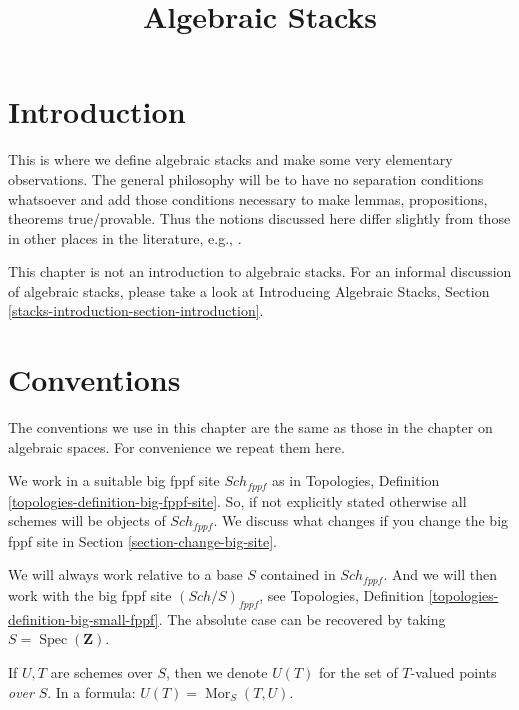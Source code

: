 \documentclass{stacks-project}
\theoremstyle{plain}
\theoremstyle{definition}
\theoremstyle{remark}
\numberwithin{equation}{subsection}
\def\Spec{\mathop{\mathrm{Spec}}}
\def\Sch{\mathit{Sch}}
\def\Mor{\mathop{\mathrm{Mor}}\nolimits}
\begin{document}
\title{Algebraic Stacks}


\maketitle

\label{section-phantom}

\tableofcontents

\section{Introduction}
\label{section-introduction}

\noindent
This is where we define algebraic stacks and make some very elementary
observations. The general philosophy will be to have no separation
conditions whatsoever and add those conditions necessary to make lemmas,
propositions, theorems true/provable. Thus the notions discussed here
differ slightly from those in other places in the literature, e.g.,
\cite{LM-B}.

\medskip\noindent
This chapter is not an introduction to algebraic stacks.
For an informal discussion of algebraic stacks, please take a look at
Introducing Algebraic Stacks, Section
\ref{stacks-introduction-section-introduction}.


\section{Conventions}
\label{section-conventions}

\noindent
The conventions we use in this chapter are the same as those in the
chapter on algebraic spaces. For convenience we repeat them here.

\medskip\noindent
We work in a suitable big fppf site $\Sch_{fppf}$
as in Topologies, Definition \ref{topologies-definition-big-fppf-site}.
So, if not explicitly stated otherwise all schemes will be objects
of $\Sch_{fppf}$. We discuss what changes if you change the big
fppf site in
Section \ref{section-change-big-site}.

\medskip\noindent
We will always work relative to a base $S$ contained in $\Sch_{fppf}$.
And we will then work with the big fppf site $(\Sch/S)_{fppf}$, see
Topologies, Definition \ref{topologies-definition-big-small-fppf}.
The absolute case can be recovered by taking
$S = \Spec(\mathbf{Z})$.

\medskip\noindent
If $U, T$ are schemes over $S$, then we denote
$U(T)$ for the set of $T$-valued points {\it over} $S$.
In a formula: $U(T) = \Mor_S(T, U)$.
\end{document}
